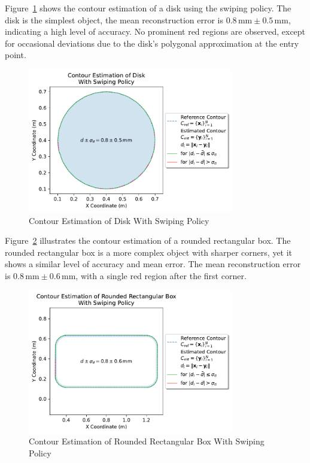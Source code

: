 Figure~\ref{fig:experiment-disk-swiping} shows the contour estimation of a disk using the swiping policy.
The disk is the simplest object, the mean reconstruction error is $0.8\,\text{mm} \pm 0.5\,\text{mm}$, indicating a high level of accuracy.
No prominent red regions are observed, except for occasional deviations due to the disk's polygonal approximation at the entry point.

\begin{figure}[!htb]
    \centering
    \includegraphics[width=0.8\textwidth]{figures/experiments/disk-swiping}
    \caption{Contour Estimation of Disk With Swiping Policy}
    \label{fig:experiment-disk-swiping}
\end{figure}

Figure~\ref{fig:experiment-rounded-rectangular-box-swiping} illustrates the contour estimation of a rounded rectangular box.
The rounded rectangular box is a more complex object with sharper corners, yet it shows a similar level of accuracy and mean error.
The mean reconstruction error is $0.8\,\text{mm} \pm 0.6\,\text{mm}$, with a single red region after the first corner.

\begin{figure}[!htb]
    \centering
    \includegraphics[width=0.8\textwidth]{figures/experiments/rounded-rectangular-box-swiping}
    \caption{Contour Estimation of Rounded Rectangular Box With Swiping Policy}
    \label{fig:experiment-rounded-rectangular-box-swiping}
\end{figure}

